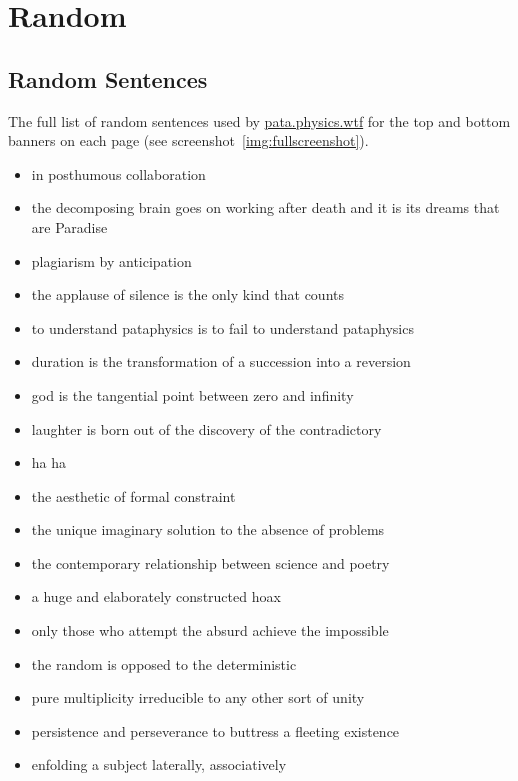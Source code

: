 
\chapter{Random}
\label{app:random}

\vspace{5cm}


\section{Random Sentences}
\label{s:appsentences}

The full list of random sentences used by \url{pata.physics.wtf} for the top and bottom banners on each page (see screenshot~\ref{img:fullscreenshot}).

\begin{itemize}
  \item in posthumous collaboration
  \item the decomposing brain goes on working after death and it is its dreams that are Paradise
  \item plagiarism by anticipation
  \item the applause of silence is the only kind that counts
  \item to understand pataphysics is to fail to understand pataphysics
  \item duration is the transformation of a succession into a reversion
  \item god is the tangential point between zero and infinity
  \item laughter is born out of the discovery of the contradictory
  \item ha ha
  \item the aesthetic of formal constraint
  \item the unique imaginary solution to the absence of problems
  \item the contemporary relationship between science and poetry
  \item a huge and elaborately constructed hoax
  \item only those who attempt the absurd achieve the impossible
  \item the random is opposed to the deterministic
  \item pure multiplicity irreducible to any other sort of unity
  \item persistence and perseverance to buttress a fleeting existence
  \item enfolding a subject laterally, associatively

\end{itemize}
